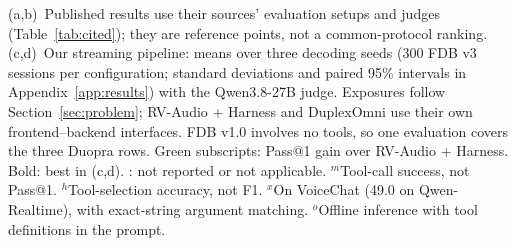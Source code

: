 \begin{table}[!t]
{(a,b)~Published results \citep{lin2026fdbv3,mosi2026mosslive,hu2026frontendbackend,shen2026duplexagentrsi,venus2026realtimevenus,orantqing2026gander,nemotronlabs2026voicechat} use their sources' evaluation setups and judges (Table~\ref{tab:cited}); they are reference points, not a common-protocol ranking.
(c,d)~Our streaming pipeline: means over three decoding seeds (300 FDB v3 sessions per configuration; standard deviations and paired 95\% intervals in Appendix~\ref{app:results}) with the Qwen3.8-27B judge. Exposures follow Section~\ref{sec:problem}; RV-Audio + Harness and DuplexOmni use their own frontend--backend interfaces. FDB v1.0 involves no tools, so one evaluation covers the three Duopra rows.
Green subscripts: Pass@1 gain over RV-Audio + Harness. Bold: best in (c,d). \na: not reported or not applicable.
$^{m}$Tool-call success, not Pass@1. $^{h}$Tool-selection accuracy, not F1. $^{x}$On VoiceChat (49.0 on Qwen-Realtime), with exact-string argument matching. $^{o}$Offline inference with tool definitions in the prompt.}
\label{tab:main}
\end{table}
